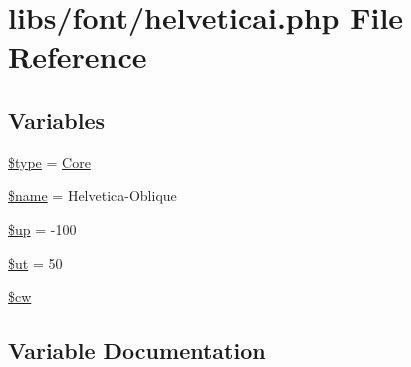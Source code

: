 \hypertarget{helveticai_8php}{}\section{libs/font/helveticai.php File Reference}
\label{helveticai_8php}
\subsection*{Variables}
\begin{DoxyCompactItemize}
\item 
\hyperlink{helveticai_8php_a9a4a6fba2208984cabb3afacadf33919}{\$type} = \textquotesingle{}\hyperlink{class_core}{Core}\textquotesingle{}
\item 
\hyperlink{helveticai_8php_ab2fc40d43824ea3e1ce5d86dee0d763b}{\$name} = \textquotesingle{}Helvetica-\/Oblique\textquotesingle{}
\item 
\hyperlink{helveticai_8php_a6b5ad2ac55f9df46e8f34e78fbd6f176}{\$up} = -\/100
\item 
\hyperlink{helveticai_8php_aadd3f841051043ee58e587e840e8dd0b}{\$ut} = 50
\item 
\hyperlink{helveticai_8php_ac2951b03dbb0317e6c61ec920b7479dc}{\$cw}
\end{DoxyCompactItemize}


\subsection{Variable Documentation}
\hypertarget{helveticai_8php_ac2951b03dbb0317e6c61ec920b7479dc}{}
